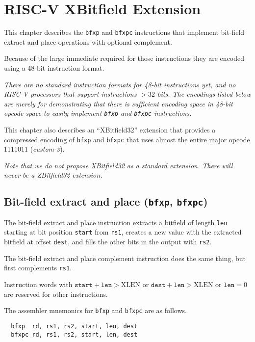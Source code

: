 \chapter{RISC-V XBitfield Extension}
\label{bfxp}

This chapter describes the {\tt bfxp} and {\tt bfxpc} instructions that implement
bit-field extract and place operations with optional complement.

Because of the large immediate required for those instructions they are encoded
using a 48-bit instruction format.

{\it There are no standard instruction formats for 48-bit instructions yet, and
no RISC-V processors that support instructions $>32$ bits. The encodings listed
below are merely for demonstrating that there is sufficient encoding space in
48-bit opcode space to easily implement {\tt bfxp} and {\tt bfxpc}
instructions.}

This chapter also describes an ``XBitfield32'' extension that provides a compressed
encoding of {\tt bfxp} and {\tt bfxpc} that uses almost the entire major opcode
1111011 ({\it custom-3}).

{\it Note that we do not propose XBitfield32 as a standard extension. There
will never be a ZBitfield32 extension.}

\section{Bit-field extract and place ({\tt bfxp}, {\tt bfxpc})}

The bit-field extract and place instruction extracts a bitfield of length
{\tt len} starting at bit position {\tt start} from {\tt rs1}, creates a new value with
the extracted bitfield at offset {\tt dest}, and fills the other bits
in the output with {\tt rs2}.

The bit-field extract and place complement instruction does the same thing,
but first complements {\tt rs1}.

Instruction words with $\texttt{start}+\texttt{len}>\textrm{XLEN}$ or
$\texttt{dest}+\texttt{len}>\textrm{XLEN}$ or $\texttt{len} = 0$ are
reserved for other instructions.



The assembler mnemonics for {\tt bfxp} and {\tt bfxpc} are as follows.

\begin{verbatim}
  bfxp  rd, rs1, rs2, start, len, dest
  bfxpc rd, rs1, rs2, start, len, dest
\end{verbatim}

